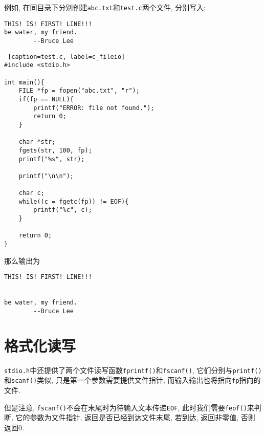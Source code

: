         例如, 在同目录下分别创建\texttt{abc.txt}和\texttt{test.c}两个文件, 分别写入:
\begin{lstlisting}[caption=abc.txt]
THIS! IS! FIRST! LINE!!!
be water, my friend.
        --Bruce Lee
\end{lstlisting}

\begin{lstlisting} [caption=test.c, label=c_fileio]
#include <stdio.h>

int main(){
    FILE *fp = fopen("abc.txt", "r");
    if(fp == NULL){
        printf("ERROR: file not found.");
        return 0;
    }

    char *str;
    fgets(str, 100, fp);
    printf("%s", str);

    printf("\n\n");

    char c;
    while((c = fgetc(fp)) != EOF){
        printf("%c", c);
    }

    return 0;
}
\end{lstlisting}

        那么输出为
\begin{lstlisting}
THIS! IS! FIRST! LINE!!!


be water, my friend.
        --Bruce Lee
\end{lstlisting}

    \section{格式化读写}
        \begin{sloppypar}
        \texttt{stdio.h}中还提供了两个文件读写函数\texttt{fprintf()}和\texttt{fscanf()}, 它们分别与\texttt{printf()}和\texttt{scanf()}类似, 只是第一个参数需要提供文件指针, 而输入输出也将指向\texttt{fp}指向的文件. 
        \end{sloppypar}

        但是注意, \texttt{fscanf()}不会在末尾时为待输入文本传递\texttt{EOF}, 此时我们需要\texttt{feof()}来判断, 它的参数为文件指针, 返回是否已经到达文件末尾, 若到达, 返回非零值, 否则返回0. 
        
